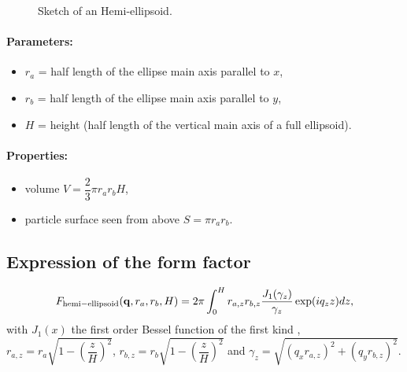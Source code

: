 \begin{figure}[ht]
\hfill
{}
\hfill
{}
\hfill
\caption{Sketch of an Hemi-ellipsoid.}
\label{fig:hemiellipsoid}
\end{figure}

\paragraph{Parameters:}
\begin{itemize}
\item $r_a$ = half length of the ellipse main axis parallel to $x$,
\item$r_b$ = half length of the ellipse main axis parallel to $y$, 
\item $H$ = height (half length of the vertical main axis of a full ellipsoid).
\end{itemize}

\paragraph{Properties:}
\begin{itemize}
\item volume $V = \dfrac{2}{3}\pi r_a r_bH$,
\item particle surface seen from above $S =\pi r_a r_b$.
\end{itemize}

\subsection{Expression of the form factor}
\begin{equation*}
F_{\rm{hemi-ellipsoid}}(\mathbf{q},r_a,r_b,H) = 2\pi \int_0 ^{H} r_{a,z} r_{b,z}
\frac{J_1(\gamma_z)}{\gamma_z}\exp(iq_z z)dz,
\end{equation*}
with $J_1(x)$ the first order
Bessel function of the first kind \cite{AbSt64}, $r_{a,z} = r_a \sqrt{1-\left(\dfrac{z}{H} \right)^2}$, ${r_{b,z} = r_b
\sqrt{1-\left(\dfrac{z}{H} \right)^2}}$ and $\gamma_z =\sqrt{(q_x r_{a,z})^2+(q_y r_{b,z})^2}$.

